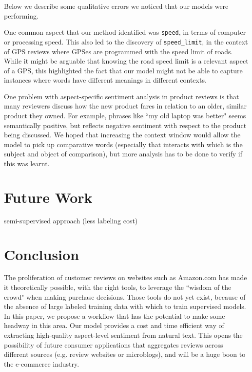 \documentclass{article} %
\begin{document}
Below we describe some qualitative errors we noticed that our models were performing.

One common aspect that our method identified was \texttt{speed}, in terms of computer or processing speed. This also led to the discovery of \texttt{speed\_limit}, in the context of GPS reviews where GPSes are programmed with the speed limit of roads. While it might be arguable that knowing the road speed limit is a relevant aspect of a GPS, this highlighted the fact that our model might not be able to capture instances where words have different meanings in different contexts.

One problem with aspect-specific sentiment analysis in product reviews is that many reviewers discuss how the new product fares in relation to an older, similar product they owned. For example, phrases like ``my old laptop was better" seems semantically positive, but reflects negative sentiment with respect to the product being discussed. We hoped that increasing the context window would allow the model to pick up comparative words (especially that interacts with which is the subject and object of comparison), but more analysis has to be done to verify if this was learnt.


\section{Future Work}
semi-supervised approach (less labeling cost)


\section{Conclusion}

The proliferation of customer reviews on websites such as Amazon.com has made it theoretically possible, with the right tools, to leverage the ``wisdom of the crowd" when making purchase decisions. Those tools do not yet exist, because of the absence of large labeled training data with which to train supervised models. In this paper, we propose a workflow that has the potential to make some headway in this area. Our model provides a cost and time efficient way of extracting high-quality aspect-level sentiment from natural text. This opens the possibility of future consumer applications that aggregates reviews across different sources (e.g. review websites or microblogs), and will be a huge boon to the e-commerce industry.
\end{document}
